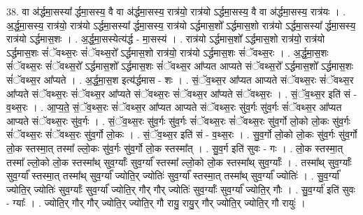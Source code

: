 \documentclass[17pt]{extarticle}
\begin{document}
38. वा अ॑र्द्धमा॒सस्या᳚ र्द्धमा॒सस्य॒ वै वा अ॑र्द्धमा॒सस्य॒ रात्र॑यो॒ रात्र॑यो ऽर्द्धमा॒सस्य॒ वै वा अ॑र्द्धमा॒सस्य॒ रात्र॑यः । . अ॒र्द्ध॒मा॒सस्य॒ रात्र॑यो॒ रात्र॑यो ऽर्द्धमा॒सस्या᳚ र्द्धमा॒सस्य॒ रात्र॑यो ऽर्द्धमास॒शो᳚ ऽर्द्धमास॒शो रात्र॑यो ऽर्द्धमा॒सस्या᳚ र्द्धमा॒सस्य॒ रात्र॑यो ऽर्द्धमास॒शः । . अ॒र्द्ध॒मा॒सस्येत्य॑र्द्ध - मा॒सस्य॑ । . रात्र॑यो ऽर्द्धमास॒शो᳚ ऽर्द्धमास॒शो रात्र॑यो॒ रात्र॑यो ऽर्द्धमास॒शः सं॑ॅवथ्स॒रः सं॑ॅवथ्स॒रो᳚ ऽर्द्धमास॒शो रात्र॑यो॒ रात्र॑यो ऽर्द्धमास॒शः सं॑ॅवथ्स॒रः । . अ॒र्द्ध॒मा॒स॒शः सं॑ॅवथ्स॒रः सं॑ॅवथ्स॒रो᳚ ऽर्द्धमास॒शो᳚ ऽर्द्धमास॒शः सं॑ॅवथ्स॒र आ᳚प्यत आप्यते संॅवथ्स॒रो᳚ ऽर्द्धमास॒शो᳚ ऽर्द्धमास॒शः सं॑ॅवथ्स॒र आ᳚प्यते । . अ॒र्द्ध॒मा॒स॒श इत्य॑र्द्धमास - शः । . सं॒ॅव॒थ्स॒र आ᳚प्यत आप्यते संॅवथ्स॒रः सं॑ॅवथ्स॒र आ᳚प्यते संॅवथ्स॒रः सं॑ॅवथ्स॒र आ᳚प्यते संॅवथ्स॒रः सं॑ॅवथ्स॒र आ᳚प्यते संॅवथ्स॒रः । . सं॒ॅव॒थ्स॒र इति॑ सं - व॒थ्स॒रः । . आ॒प्य॒ते॒ सं॒ॅव॒थ्स॒रः सं॑ॅवथ्स॒र आ᳚प्यत आप्यते संॅवथ्स॒रः सु॑व॒र्गः सु॑व॒र्गः सं॑ॅवथ्स॒र आ᳚प्यत आप्यते संॅवथ्स॒रः सु॑व॒र्गः । . सं॒ॅव॒थ्स॒रः सु॑व॒र्गः सु॑व॒र्गः सं॑ॅवथ्स॒रः सं॑ॅवथ्स॒रः सु॑व॒र्गो लो॒को लो॒कः सु॑व॒र्गः सं॑ॅवथ्स॒रः सं॑ॅवथ्स॒रः सु॑व॒र्गो लो॒कः । . सं॒ॅव॒थ्स॒र इति॑ सं - व॒थ्स॒रः । . सु॒व॒र्गो लो॒को लो॒कः सु॑व॒र्गः सु॑व॒र्गो लो॒क स्तस्मा॒त् तस्मा᳚ ल्लो॒कः सु॑व॒र्गः सु॑व॒र्गो लो॒क स्तस्मा᳚त् । . सु॒व॒र्ग इति॑ सुवः - गः । . लो॒क स्तस्मा॒त् तस्मा᳚ ल्लो॒को लो॒क स्तस्मा᳚थ् सुव॒र्ग्याः᳚ सुव॒र्ग्या᳚ स्तस्मा᳚ ल्लो॒को लो॒क स्तस्मा᳚थ् सुव॒र्ग्याः᳚ । . तस्मा᳚थ् सुव॒र्ग्याः᳚ सुव॒र्ग्या᳚ स्तस्मा॒त् तस्मा᳚थ् सुव॒र्ग्या᳚ ज्योति॒र् ज्योतिः॑ सुव॒र्ग्या᳚ स्तस्मा॒त् तस्मा᳚थ् सुव॒र्ग्या᳚ ज्योतिः॑ । . सु॒व॒र्ग्या᳚ ज्योति॒र् ज्योतिः॑ सुव॒र्ग्याः᳚ सुव॒र्ग्या᳚ ज्योति॒र् गौर् गौर् ज्योतिः॑ सुव॒र्ग्याः᳚ सुव॒र्ग्या᳚ ज्योति॒र् गौः । . सु॒व॒र्ग्या॑ इति॑ सुवः - ग्याः᳚ । . ज्योति॒र् गौर् गौर् ज्योति॒र् ज्योति॒र् गौ रायु॒ रायु॒र् गौर् ज्योति॒र् ज्योति॒र् गौ रायुः॑ । \newline
\end{document}
